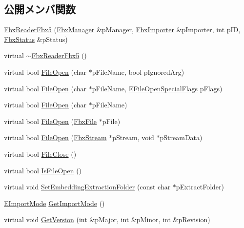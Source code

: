 \subsection*{公開メンバ関数}
\begin{DoxyCompactItemize}
\item 
\hyperlink{class_fbx_reader_fbx5_ad9ae3c7eebf1b77a35066a545abb9792}{Fbx\+Reader\+Fbx5} (\hyperlink{class_fbx_manager}{Fbx\+Manager} \&p\+Manager, \hyperlink{class_fbx_importer}{Fbx\+Importer} \&p\+Importer, int p\+ID, \hyperlink{class_fbx_status}{Fbx\+Status} \&p\+Status)
\item 
virtual \hyperlink{class_fbx_reader_fbx5_ae1ebf6def0485de077076b8e18435eb6}{$\sim$\+Fbx\+Reader\+Fbx5} ()
\item 
virtual bool \hyperlink{class_fbx_reader_fbx5_afabd2457815a65017943a48fb0d0b3bc}{File\+Open} (char $\ast$p\+File\+Name, bool p\+Ignored\+Arg)
\item 
virtual bool \hyperlink{class_fbx_reader_fbx5_aa197089a894684834388a2caf43145e3}{File\+Open} (char $\ast$p\+File\+Name, \hyperlink{class_fbx_reader_a1a14bd907bcda7dd48ba9b0a6236b7b8}{E\+File\+Open\+Special\+Flags} p\+Flags)
\item 
virtual bool \hyperlink{class_fbx_reader_fbx5_a1aef8cc95eae3b44812beef48d6edb5d}{File\+Open} (char $\ast$p\+File\+Name)
\item 
virtual bool \hyperlink{class_fbx_reader_fbx5_ad48fa87e086b236db57f57eed5f50ddb}{File\+Open} (\hyperlink{class_fbx_file}{Fbx\+File} $\ast$p\+File)
\item 
virtual bool \hyperlink{class_fbx_reader_fbx5_a1ac1c0598fea61e91ac2c98de15a0d24}{File\+Open} (\hyperlink{class_fbx_stream}{Fbx\+Stream} $\ast$p\+Stream, void $\ast$p\+Stream\+Data)
\item 
virtual bool \hyperlink{class_fbx_reader_fbx5_a315730ff4083066964d32c6d3b3a717d}{File\+Close} ()
\item 
virtual bool \hyperlink{class_fbx_reader_fbx5_ae610563380260e4445a8c90646898a87}{Is\+File\+Open} ()
\item 
virtual void \hyperlink{class_fbx_reader_fbx5_ab910914828f297f51c28d88f466d6928}{Set\+Embedding\+Extraction\+Folder} (const char $\ast$p\+Extract\+Folder)
\item 
\hyperlink{class_fbx_reader_fbx5_a9d205ec64b33007dd74af093943b50c5}{E\+Import\+Mode} \hyperlink{class_fbx_reader_fbx5_a2124b8ecb7523ead3f623c47633e9e85}{Get\+Import\+Mode} ()
\item 
virtual void \hyperlink{class_fbx_reader_fbx5_a297ed289a6d5e55f33540d8efb4bfd0b}{Get\+Version} (int \&p\+Major, int \&p\+Minor, int \&p\+Revision)

\end{DoxyCompactItemize}
